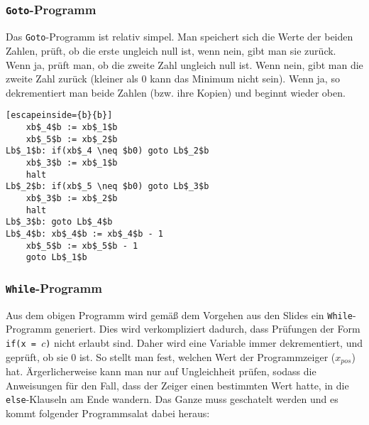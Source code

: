 \documentclass{article}
\begin{document}
\subsection{} 

\subsubsection{\texttt{Goto}-Programm}

Das \texttt{Goto}-Programm ist relativ simpel. Man speichert sich die Werte der
beiden Zahlen, prüft, ob die erste ungleich null ist, wenn nein, gibt man sie
zurück. Wenn ja, prüft man, ob die zweite Zahl ungleich null ist. Wenn
nein, gibt man die zweite Zahl zurück (kleiner als 0 kann das Minimum nicht sein).
Wenn ja, so dekrementiert man beide
Zahlen (bzw. ihre Kopien) und beginnt wieder oben.

\begin{lstlisting}[escapeinside={b}{b}]
    xb$_4$b := xb$_1$b
    xb$_5$b := xb$_2$b
Lb$_1$b: if(xb$_4 \neq $b0) goto Lb$_2$b
    xb$_3$b := xb$_1$b
    halt
Lb$_2$b: if(xb$_5 \neq $b0) goto Lb$_3$b
    xb$_3$b := xb$_2$b
    halt
Lb$_3$b: goto Lb$_4$b
Lb$_4$b: xb$_4$b := xb$_4$b - 1
    xb$_5$b := xb$_5$b - 1
    goto Lb$_1$b

\end{lstlisting}

\subsubsection{\texttt{While}-Programm}

Aus dem obigen Programm wird gemäß dem Vorgehen aus den Slides ein
\texttt{While}-Programm generiert. Dies wird verkompliziert dadurch, dass
Prüfungen der Form \texttt{if(x = $c$)} nicht erlaubt sind. Daher wird eine
Variable immer dekrementiert, und geprüft, ob sie 0 ist. So stellt man fest,
welchen Wert der Programmzeiger ($x_{pos}$) hat. Ärgerlicherweise kann man nur
auf Ungleichheit prüfen, sodass die Anweisungen für den Fall, dass der Zeiger
einen bestimmten Wert hatte, in die \texttt{else}-Klauseln am Ende wandern. Das
Ganze muss geschatelt werden und es kommt folgender Programmsalat dabei heraus:
\end{document}

